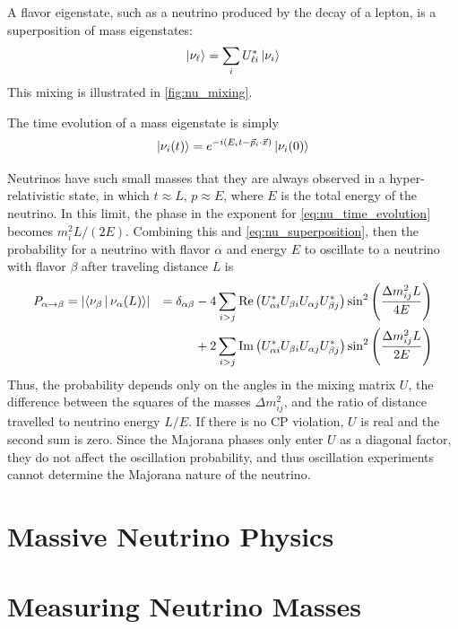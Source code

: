 \documentclass[herrin-thesis.tex]{subfiles}
\begin{document}
 A flavor eigenstate, such as a neutrino produced by the decay of a lepton, is a superposition of mass eigenstates:
 \begin{equation}
 \Ket{\nu_{\ell}} = \sum_{i}U_{\ell i}^{*} \Ket{\nu_i}
 \label{eq:nu_superposition}
 \end{equation}
 This mixing is illustrated in \cref{fig:nu_mixing}.
 
 The time evolution of a mass eigenstate is simply
 \begin{equation}
 \Ket{\nu_{i}(t)} = e^{-i(E_i t - \vec{p}_i\cdot\vec{x})}\Ket{\nu_i(0)}
 \label{eq:nu_time_evolution}
 \end{equation}

Neutrinos have such small masses that they are always observed in a hyper-relativistic state, in which \(t\approx L\), \(p\approx E\), where \(E\) is the total energy of the neutrino. In this limit, the phase in the exponent for \cref{eq:nu_time_evolution} becomes \(m_i^2 L/(2E)\). Combining this and \cref{eq:nu_superposition}, then the probability for a neutrino with flavor \(\alpha\) and energy \(E\) to oscillate to a neutrino with flavor \(\beta\) after traveling distance \(L\) is
\begin{align}
P_{\alpha\rightarrow\beta}	& = \left | \Braket{\nu_\beta | \nu_\alpha(L)} \right |	& = \delta_{\alpha\beta}	& - 4\sum_{i>j}\text{Re}\left(U_{\alpha i}^{*}U_{\beta i}U_{\alpha j}U_{\beta j}^{*}\right)\sin^2\left(\frac{\Delta m_{ij}^2 L}{4 E}\right)\nonumber\\
						&										&					& +2\sum_{i>j}\text{Im}\left(U_{\alpha i}^{*}U_{\beta i}U_{\alpha j}U_{\beta j}^{*}\right)\sin^2\left(\frac{\Delta m_{ij}^2 L}{2 E}\right)
\label{eq:nu_oscillation_prob}
\end{align}
Thus, the probability depends only on the angles in the mixing matrix \(U\), the difference between the squares of the masses \(\Delta m_{ij}^2\), and the ratio of distance travelled to neutrino energy \(L/E\). If there is no CP violation, \(U\) is real and the second sum is zero. Since the Majorana phases only enter \(U\) as a diagonal factor, they do not affect the oscillation probability, and thus oscillation experiments cannot determine the Majorana nature of the neutrino.

\section{Massive Neutrino Physics}

\section{Measuring Neutrino Masses}
\end{document}
